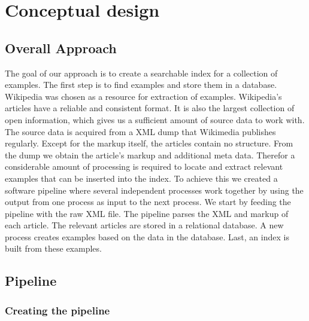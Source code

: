
\chapter{Conceptual design}\label{cap_3}



\section{Overall Approach}

The goal of our approach is to create a searchable index for a collection of examples. The first step is to find examples and store them in a database. Wikipedia was chosen as a resource for extraction of examples. Wikipedia's articles have a reliable and consistent format. It is also the largest collection of open information, which gives us a sufficient amount of source data to work with. The source data is acquired from a XML dump that Wikimedia publishes regularly. Except for the markup itself, the articles contain no structure. From the dump we obtain the article's markup and additional meta data. Therefor a considerable amount of processing is required to locate and extract relevant examples that can be inserted into the index. To achieve this we created a software pipeline where several independent processes work together by using the output from one process as input to the next process. We start by feeding the pipeline with the raw XML file. The pipeline parses the XML and markup of each article. The relevant articles are stored in a relational database. A new process creates examples based on the data in the database. Last, an index is built from these examples.

\section{Pipeline} \label{cd_pipeline}

\subsection{Creating the pipeline} \label{custom-pipeline}


